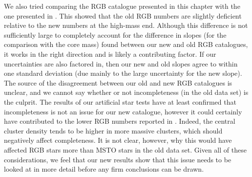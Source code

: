 We also tried comparing the RGB catalogue presented in this chapter with
the one presented in \citet{leigh09}.  This showed that the
old RGB numbers are slightly 
deficient relative to the new numbers at the high-mass end.  Although this
difference is not sufficiently large to completely account for the
difference in slopes (for the comparison with the core mass) found
between our new and old RGB catalogues, it works in the right
direction and is likely a contributing factor.  If our uncertainties
are also factored in, then our new and old slopes agree to within one
standard deviation (due mainly to the large uncertainty for the new
slope).  The source of the disagreement between our old and new RGB
catalogues is unclear, and we cannot say whether or not 
incompleteness (in the old data set) is the culprit.  The results of
our artificial star tests have at least confirmed that incompleteness
is not an issue for our new catalogue, however it could certainly have
contributed to the lower RGB numbers reported in \citet{leigh09}.
Indeed, the central cluster density tends to be 
higher in more massive clusters, which should negatively affect
completeness.  It is not clear, however, why this would have affected
RGB stars more than MSTO stars in the old data set.  
Given all of these considerations, we feel that our new results show
that this issue needs to be looked at in more detail before any firm
conclusions can be drawn.  

